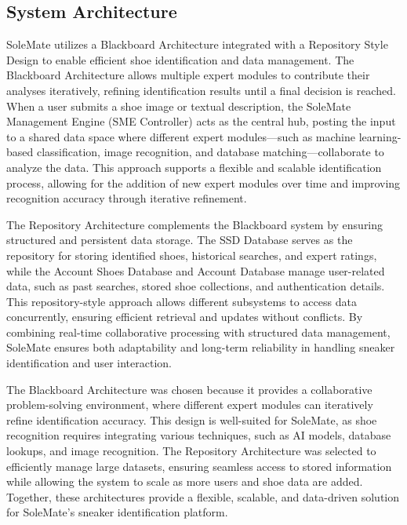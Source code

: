 \documentclass[]{article}
\begin{document}
\subsection{System Architecture}
\label{sub:system_architecture}
SoleMate utilizes a Blackboard Architecture integrated with a Repository Style Design to enable efficient shoe identification and data management. The Blackboard Architecture allows multiple expert modules to contribute their analyses iteratively, refining identification results until a final decision is reached. When a user submits a shoe image or textual description, the SoleMate Management Engine (SME Controller) acts as the central hub, posting the input to a shared data space where different expert modules—such as machine learning-based classification, image recognition, and database matching—collaborate to analyze the data. This approach supports a flexible and scalable identification process, allowing for the addition of new expert modules over time and improving recognition accuracy through iterative refinement. \par
The Repository Architecture complements the Blackboard system by ensuring structured and persistent data storage. The SSD Database serves as the repository for storing identified shoes, historical searches, and expert ratings, while the Account Shoes Database and Account Database manage user-related data, such as past searches, stored shoe collections, and authentication details. This repository-style approach allows different subsystems to access data concurrently, ensuring efficient retrieval and updates without conflicts. By combining real-time collaborative processing with structured data management, SoleMate ensures both adaptability and long-term reliability in handling sneaker identification and user interaction. \par
The Blackboard Architecture was chosen because it provides a collaborative problem-solving environment, where different expert modules can iteratively refine identification accuracy. This design is well-suited for SoleMate, as shoe recognition requires integrating various techniques, such as AI models, database lookups, and image recognition. The Repository Architecture was selected to efficiently manage large datasets, ensuring seamless access to stored information while allowing the system to scale as more users and shoe data are added. Together, these architectures provide a flexible, scalable, and data-driven solution for SoleMate’s sneaker identification platform. \par
\end{document}
